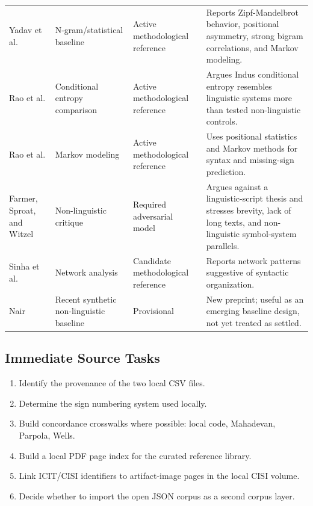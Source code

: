 \begin{longtable}{p{}p{}p{}p{}}
Yadav et al. \citep{yadav2010plosone} & N-gram/statistical baseline & Active methodological reference & Reports Zipf-Mandelbrot behavior, positional asymmetry, strong bigram correlations, and Markov modeling. \\
Rao et al. \citep{rao2009science} & Conditional entropy comparison & Active methodological reference & Argues Indus conditional entropy resembles linguistic systems more than tested non-linguistic controls. \\
Rao et al. \citep{rao2009pnas} & Markov modeling & Active methodological reference & Uses positional statistics and Markov methods for syntax and missing-sign prediction. \\
Farmer, Sproat, and Witzel \citep{farmer2004collapse} & Non-linguistic critique & Required adversarial model & Argues against a linguistic-script thesis and stresses brevity, lack of long texts, and non-linguistic symbol-system parallels. \\
Sinha et al. \citep{sinha2010network} & Network analysis & Candidate methodological reference & Reports network patterns suggestive of syntactic organization. \\
Nair \citep{nair2026progress} & Recent synthetic non-linguistic baseline & Provisional & New preprint; useful as an emerging baseline design, not yet treated as settled. \\
\bottomrule
\end{longtable}

\subsection{Immediate Source Tasks}

\begin{enumerate}
  \item Identify the provenance of the two local CSV files.
  \item Determine the sign numbering system used locally.
  \item Build concordance crosswalks where possible: local code, Mahadevan, Parpola, Wells.
  \item Build a local PDF page index for the curated reference library.
  \item Link ICIT/CISI identifiers to artifact-image pages in the local CISI volume.
  \item Decide whether to import the open JSON corpus as a second corpus layer.
\end{enumerate}
